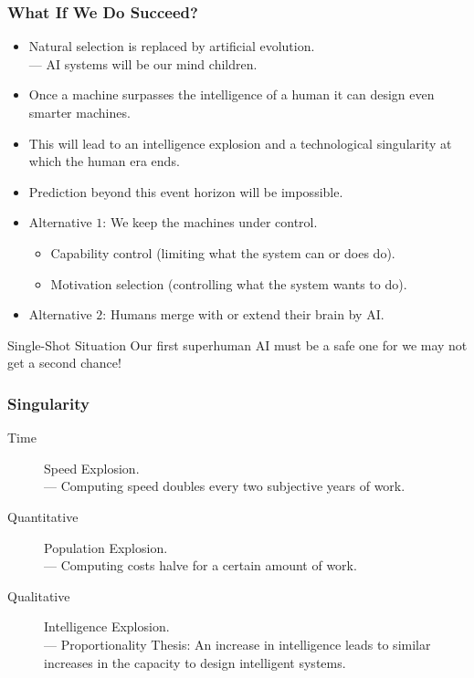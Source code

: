 \documentclass[UTF8,11pt,colorlinks,compress,openany]{beamer}%
\begin{document}
\begin{frame}\frametitle{What If We Do Succeed?}
\begin{itemize}
	\item Natural selection is replaced by artificial evolution.\\
	--- AI systems will be our mind children.
	\item Once a machine surpasses the intelligence of a human it can design even smarter machines.
	\item This will lead to an intelligence explosion and a technological singularity at which the human era ends.
	\item Prediction beyond this event horizon will be impossible.
	\item Alternative $1$: We keep the machines under control.
		\begin{itemize}
			\item Capability control (limiting what the system can or does do).
			\item Motivation selection (controlling what the system wants to do).
		\end{itemize}
	\item Alternative $2$: Humans merge with or extend their brain by AI.
\end{itemize}
\begin{block}{Single-Shot Situation}
Our first superhuman AI must be a safe one for we may not get a second chance!
\end{block}
\end{frame}

\begin{frame}\frametitle{Singularity}
\begin{description}
	\item[Time] Speed Explosion.\\
	--- Computing speed doubles every two subjective years of work.
	\item[Quantitative] Population Explosion.\\
	--- Computing costs halve for a certain amount of work.
	\item[Qualitative] Intelligence Explosion.\\
	--- Proportionality Thesis: An increase in intelligence leads to similar increases in the capacity to design intelligent systems.
\end{description}
\end{frame}
\end{document}
